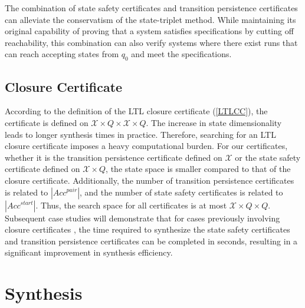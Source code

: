 \documentclass[acmlarge]{acmart}
\begin{document}

The combination of state safety certificates and transition persistence certificates can alleviate the conservatism of the state-triplet method. While maintaining its original capability of proving that a system satisfies specifications by cutting off reachability, this combination can also verify systems where there exist runs that can reach accepting states from $q_0$ and meet the specifications.

\subsection{Closure Certificate}
According to the definition of the LTL closure certificate (\ref{LTLCC}), the certificate is defined on $\mathcal{X} \times Q \times \mathcal{X} \times Q$. The increase in state dimensionality leads to longer synthesis times in practice. Therefore, searching for an LTL closure certificate imposes a heavy computational burden. For our certificates, whether it is the transition persistence certificate defined on $\mathcal{X}$ or the state safety certificate defined on $\mathcal{X} \times Q$, the state space is smaller compared to that of the closure certificate. Additionally, the number of transition persistence certificates is related to $|Acc^{pair}|$, and the number of state safety certificates is related to $|Acc^{start}|$. Thus, the search space for all certificates is at most $\mathcal{X} \times Q \times Q$. Subsequent case studies will demonstrate that for cases previously involving closure certificates \cite{murali2024closure}, the time required to synthesize the state safety certificates and transition persistence certificates can be completed in seconds, resulting in a significant improvement in synthesis efficiency.

\section{Synthesis}
\end{document}
